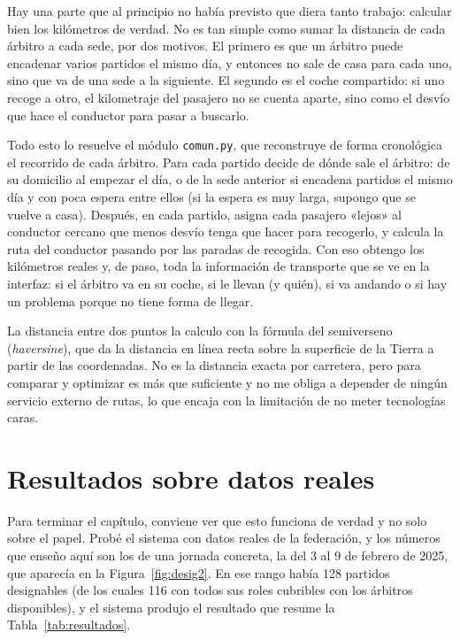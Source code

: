 \documentclass[11pt,a4paper,spanish]{book}
\numberwithin{equation}{chapter}
\numberwithin{figure}{chapter}
\numberwithin{table}{chapter}
\begin{document}
Hay una parte que al principio no había previsto que diera tanto trabajo: calcular bien los kilómetros de verdad. No es tan simple como sumar la distancia de cada árbitro a cada sede, por dos motivos. El primero es que un árbitro puede encadenar varios partidos el mismo día, y entonces no sale de casa para cada uno, sino que va de una sede a la siguiente. El segundo es el coche compartido: si uno recoge a otro, el kilometraje del pasajero no se cuenta aparte, sino como el desvío que hace el conductor para pasar a buscarlo.

Todo esto lo resuelve el módulo \texttt{comun.py}, que reconstruye de forma cronológica el recorrido de cada árbitro. Para cada partido decide de dónde sale el árbitro: de su domicilio al empezar el día, o de la sede anterior si encadena partidos el mismo día y con poca espera entre ellos (si la espera es muy larga, supongo que se vuelve a casa). Después, en cada partido, asigna cada pasajero «lejos» al conductor cercano que menos desvío tenga que hacer para recogerlo, y calcula la ruta del conductor pasando por las paradas de recogida. Con eso obtengo los kilómetros reales y, de paso, toda la información de transporte que se ve en la interfaz: si el árbitro va en su coche, si le llevan (y quién), si va andando o si hay un problema porque no tiene forma de llegar.

La distancia entre dos puntos la calculo con la fórmula del semiverseno (\emph{haversine}), que da la distancia en línea recta sobre la superficie de la Tierra a partir de las coordenadas. No es la distancia exacta por carretera, pero para comparar y optimizar es más que suficiente y no me obliga a depender de ningún servicio externo de rutas, lo que encaja con la limitación de no meter tecnologías caras.

\section{Resultados sobre datos reales}
\label{sec:resultados}

Para terminar el capítulo, conviene ver que esto funciona de verdad y no solo sobre el papel. Probé el sistema con datos reales de la federación, y los números que enseño aquí son los de una jornada concreta, la del 3 al 9 de febrero de 2025, que aparecía en la Figura~\ref{fig:desig2}. En ese rango había 128 partidos designables (de los cuales 116 con todos sus roles cubribles con los árbitros disponibles), y el sistema produjo el resultado que resume la Tabla~\ref{tab:resultados}.
\end{document}
